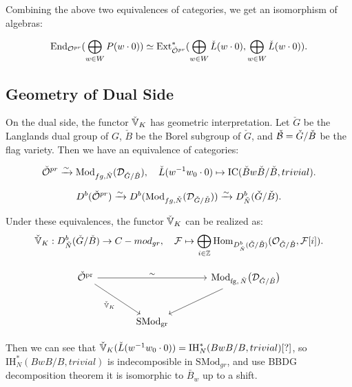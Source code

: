 Combining the above two equivalences of categories, we get an isomorphism of algebras:

\begin{thm}
  \[
    \operatorname{End}_{\mathcal{O}^{pr}}( \bigoplus_{w \in W} P(w \cdot 0)) \simeq \mathrm{Ext}^*_{\check{\mathcal{O}}^{pr}}(\bigoplus_{w \in W} \check{L}(w \cdot 0),\bigoplus_{w \in W} \check{L}(w \cdot 0)).
  \]
\end{thm}


\subsection{Geometry of Dual Side}

On the dual side, the functor $\check{\mathbb{V}}_K$ has geometric interpretation. Let $\check{G}$ be the Langlands dual group of $G$, $\check{B}$ be the Borel subgroup of $\check{G}$, and $\check{\mathcal{B}} = \check{G}/\check{B}$ be the flag variety. Then we have an equivalence of categories:

\[
  \check{\mathcal{O}}^{pr} \xrightarrow{\sim} \mathrm{Mod}_{fg,\check{N}}(\mathcal{D}_{\check{G}/\check{B}}), \quad \check{L}(w^{-1}w_0 \cdot 0) \mapsto \mathrm{IC}(\check{B}w\check{B}/\check{B}, trivial).
\]

\[
  D^b(\check{{\mathcal{O}}}^{pr}) \xrightarrow{\sim} D^b(\mathrm{Mod}_{fg,\check{N}}(\mathcal{D}_{\check{G}/\check{B}})) \xrightarrow{\sim} D^b_{\check{N}}(\check{G}/\check{B}).
\]

Under these equivalences, the functor $\check{\mathbb{V}}_K$ can be realized as:
\[
  \check{\mathbb{V}}_K: D^b_{\check{N}}(\check{G}/\check{B}) \to C-mod_{gr}, \quad \mathcal{F} \mapsto \bigoplus_{i \in \mathbb{Z}} \operatorname{Hom}_{D^b_{\check{N}}(\check{G}/\check{B})}(\mathcal{O}_{\check{G}/\check{B}},\mathcal{F}[i]).
\]

\[
\begin{tikzcd}[column sep=large, row sep=large]
\check{\mathcal O}^{\mathrm{pr}}
  \arrow[rr, "\sim"]
  \arrow[dr, "\check{\mathbb V}_K"']
&&
\operatorname{Mod}_{\mathrm{fg},\,\check N}
  \bigl(\mathcal D_{\check G/\check B}\bigr)
  \arrow[dl]
\\
& \operatorname{SMod}_{\mathrm{gr}} &
\end{tikzcd}
\]

Then we can see that $\check{\mathbb{V}}_K(\check{L}(w^{-1}w_0 \cdot 0)) = \mathrm{IH}^*_N(BwB/B,trivial)[?]$, so $\mathrm{IH}^*_N(BwB/B,trivial)$ is indecomposible in $\mathrm{SMod}_{gr}$, and use BBDG decomposition theorem it is isomorphic to $\bar{B}_w$ up to a shift.





